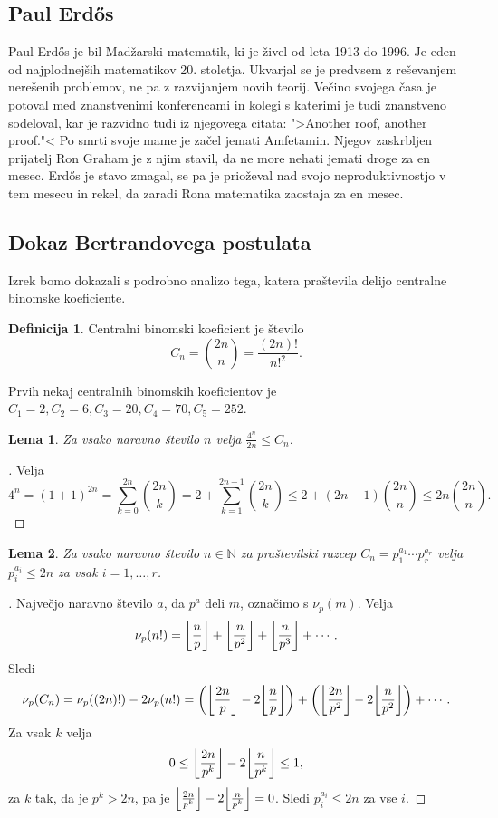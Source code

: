 \documentclass[a4paper,12pt]{article}
\def\N{\mathbb{N}}
\theoremstyle{definition}
\newtheorem{definicija}{Definicija}
\theoremstyle{plain}
\newtheorem{lema}{Lema}
\newenvironment{dokaz}{\begin{proof}[\bfseries\upshape\proofname]}{\end{proof}}
\DeclarePairedDelimiter\floor{\lfloor}{\rfloor}
\begin{document}
\subsection{Paul Erd\H{o}s}
Paul Erd\H{o}s je bil Madžarski matematik, ki je živel od leta 1913 do 1996. Je eden od najplodnejših matematikov 20. stoletja. Ukvarjal se je predvsem z reševanjem nerešenih problemov, ne pa z razvijanjem novih teorij. Večino svojega časa je potoval med znanstvenimi konferencami in kolegi s katerimi je tudi znanstveno sodeloval, kar je razvidno tudi iz njegovega citata: ">Another roof, another proof."< Po smrti svoje mame je začel jemati Amfetamin. Njegov zaskrbljen prijatelj Ron Graham je z njim stavil, da ne more nehati jemati droge za en mesec. Erd\H{o}s je stavo zmagal, se pa je prioževal nad svojo neproduktivnostjo v tem mesecu in rekel, da zaradi Rona matematika zaostaja za en mesec.


\subsection{Dokaz Bertrandovega postulata}
Izrek bomo dokazali s podrobno analizo tega, katera praštevila delijo centralne binomske koeficiente.

\begin{definicija} %
    Centralni binomski koeficient je število $$C_n = \binom{2n}{n} = \frac{(2n)!}{n!^2}.$$
\end{definicija}

Prvih nekaj centralnih binomskih koeficientov je $C_1 = 2, C_2 = 6, C_3 = 20, C_4 = 70, C_5 = 252$.

\begin{lema}
    \label{lema1}
    Za vsako naravno število $n$ velja $\frac{4^n}{2n} \leq C_n$.
\end{lema}
\begin{dokaz} %
    Velja $$4^n = (1+1)^{2n} = \sum_{k = 0}^{2n} \binom{2n}{k} = 2 + \sum_{k = 1}^{2n - 1} \binom{2n}{k} \leq 2 + (2n - 1)\binom{2n}{n} \leq 2n\binom{2n}{n}.$$
\end{dokaz}

\begin{lema}
    \label{lema2}
    Za vsako naravno število $n \in \N$ za praštevilski razcep $C_n = p_1^{a_1} \cdots p_r^{a_r}$ velja $p_i^{a_i} \leq 2n$ za vsak $i = 1,\ldots,r$. 
\end{lema}
\begin{dokaz}
    Največjo naravno število $a$, da $p^a$ deli $m$, označimo s $\nu_p(m)$. Velja $$\nu_p(n!) = \floor*{\frac{n}{p}} + \floor*{\frac{n}{p^2}} + \floor*{\frac{n}{p^3}} + \cdots.$$ Sledi $$\nu_p(C_n) = \nu_p((2n)!) - 2\nu_p(n!) = \left( \floor*{\frac{2n}{p}} - 2\floor*{\frac{n}{p}} \right) + \left( \floor*{\frac{2n}{p^2}} - 2\floor*{\frac{n}{p^2}} \right) + \cdots.$$ Za vsak $k$ velja $$0 \leq \floor*{\frac{2n}{p^k}} - 2\floor*{\frac{n}{p^k}} \leq 1,$$ za $k$ tak, da je $p^k > 2n$, pa je $\floor*{\frac{2n}{p^k}} - 2\floor*{\frac{n}{p^k}} = 0$. Sledi $p_i^{a_i} \leq 2n$ za vse $i$.
\end{dokaz}
\end{document}
